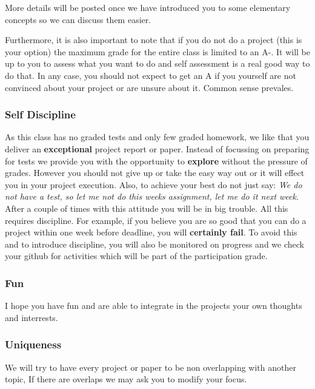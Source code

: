 More details will be posted once we have introduced you to some
elementary concepts so we can discuss them easier.

Furthermore, it is also important to note that if you do not do a
project (this is your option) the maximum grade for the entire class is
limited to an A-. It will be up to you to assess what you want to do and
self assessment is a real good way to do that. In any case, you should
not expect to get an A if you yourself are not convinced about your
project or are unsure about it. Common sense prevales.

\subsubsection{Self Discipline}

As this class has no graded tests and only few graded homework, we like
that you deliver an \textbf{exceptional} project report or paper.
Instead of focussing on preparing for tests we provide you with the
opportunity to \textbf{explore} without the pressure of grades. However
you should not give up or take the easy way out or it will effect you in
your project execution. Also, to achieve your best do not just say:
\emph{We do not have a test, so let me not do this weeks assignment, let
me do it next week}. After a couple of times with this attitude you will
be in big trouble. All this requires discipline. For example, if you
believe you are so good that you can do a project within one week before
deadline, you will \textbf{certainly fail}. To avoid this and to
introduce discipline, you will also be monitored on progress and we
check your github for activities which will be part of the participation
grade.

\subsubsection{Fun}

I hope you have fun and are able to integrate in the projects your own
thoughts and interrests.

\subsubsection{Uniqueness}

We will try to have every project or paper to be non overlapping with
another topic, If there are overlaps we may ask you to modify your
focus.
